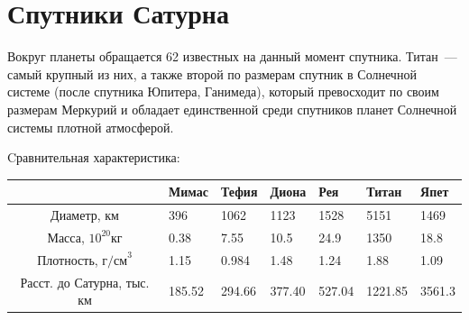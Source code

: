 \documentclass{article}
\begin{document}
    \section{Спутники Сатурна}
    Вокруг планеты обращается 62 известных на данный момент спутника. Титан~— самый крупный из них, а также второй по размерам спутник в Солнечной системе (после спутника Юпитера, Ганимеда), который превосходит по своим размерам Меркурий и обладает единственной среди спутников планет Солнечной системы плотной атмосферой. \par
    Cравнительная характеристика: \par
    \begin{table}[h!]
    \centering
    	\begin{tabularx}{0.95\textwidth}{|C{0.34}|I{0.11}|I{0.11}|I{0.11}|I{0.11}|I{0.11}|I{0.11}|}
    	\hline
     	& Мимас & Тефия & Диона & Рея & Титан & Япет \\
		\hline
		Диаметр, км & 396 & 1062 & 1123 & 1528 & 5151 & 1469 \\
		\hline
		Масса, $10^{20} \text{кг}$ & 0.38 & 7.55 & 10.5 & 24.9 & 1350 & 18.8 \\
		\hline
		Плотность, $\text{г/см}^3$ & 1.15 & 0.984 & 1.48 & 1.24 & 1.88 & 1.09 \\
		\hline
		Расст. до Сатурна, тыс. км & 185.52 & 294.66 & 377.40 & 527.04 & 1221.85 & 3561.3 \\
		\hline
    	\end{tabularx}
    \end{table}
\end{document}
